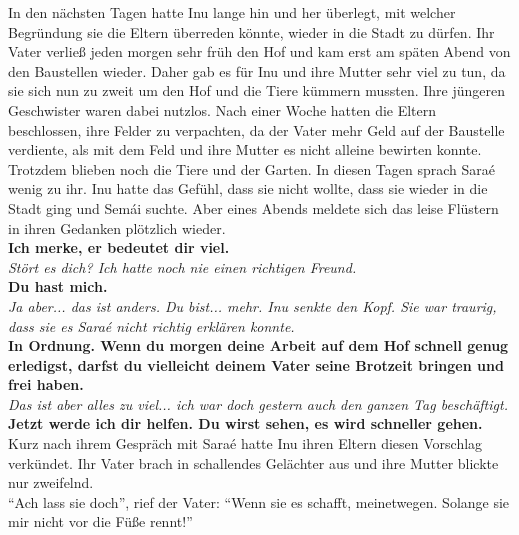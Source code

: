 In den nächsten Tagen hatte Inu lange hin und her überlegt, mit welcher Begründung sie die Eltern 
überreden könnte, wieder in die Stadt zu dürfen. Ihr Vater verließ jeden morgen sehr früh den Hof 
und kam erst am späten Abend von den Baustellen wieder. Daher gab es für Inu und ihre Mutter sehr 
viel zu tun, da sie sich nun zu zweit um den Hof und die Tiere kümmern mussten. Ihre jüngeren 
Geschwister waren dabei nutzlos. Nach einer Woche hatten die Eltern beschlossen, ihre Felder zu 
verpachten, da der Vater mehr Geld auf der Baustelle verdiente, als mit dem Feld und ihre Mutter es 
nicht alleine bewirten konnte. Trotzdem blieben noch die Tiere und der Garten. In diesen Tagen 
sprach Saraé wenig zu ihr. Inu hatte das Gefühl, dass sie nicht wollte, dass sie wieder in die 
Stadt ging und Semái suchte. Aber eines Abends meldete sich das leise Flüstern in ihren Gedanken 
plötzlich wieder.\\
\textbf{Ich merke, er bedeutet dir viel.}\\
\textit{Stört es dich? Ich hatte noch nie einen richtigen Freund.}\\
\textbf{Du hast mich.}\\
\textit{Ja aber... das ist anders. Du bist... mehr. Inu senkte den Kopf. Sie war traurig, dass sie 
es Saraé nicht richtig erklären konnte.}\\
\textbf{In Ordnung. Wenn du morgen deine Arbeit auf dem Hof schnell genug erledigst, darfst du 
vielleicht deinem Vater seine Brotzeit bringen und frei haben.}\\
\textit{Das ist aber alles zu viel... ich war doch gestern auch den ganzen Tag beschäftigt.}\\
\textbf{Jetzt werde ich dir helfen. Du wirst sehen, es wird schneller gehen.}\\
Kurz nach ihrem Gespräch mit Saraé hatte Inu ihren Eltern diesen Vorschlag verkündet. Ihr Vater 
brach in schallendes Gelächter aus und ihre Mutter blickte nur zweifelnd. \\
``Ach lass sie doch'', rief der Vater: ``Wenn sie es schafft, meinetwegen. Solange sie mir nicht 
vor die Füße rennt!''\\

